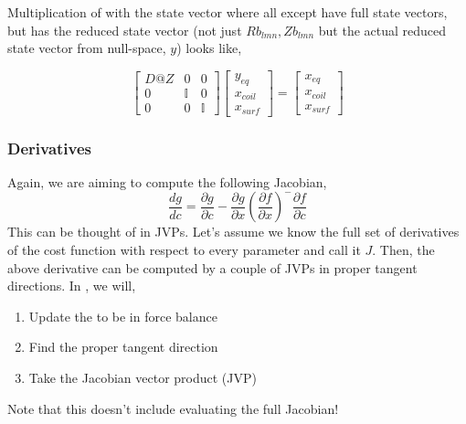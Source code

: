 Multiplication of  with the state vector where all except  have full state vectors, but  has the reduced state vector (not just $Rb_{lmn}, Zb_{lmn}$ but the actual reduced state vector from null-space, $y$) looks like,

\begin{equation}
    \begin{bmatrix}
        D@Z & 0 & 0 \\
        0 & \mathbb{I} & 0 \\
        0 & 0 & \mathbb{I} 
    \end{bmatrix}\begin{bmatrix}
        y_{eq} \\ x_{coil} \\ x_{surf}
    \end{bmatrix} = \begin{bmatrix}
        x_{eq} \\ x_{coil} \\ x_{surf}
    \end{bmatrix} \label{feasible-matmul}
\end{equation}

\subsubsection{Derivatives}

Again, we are aiming to compute the following Jacobian,
\begin{equation}
    \frac{dg}{dc} = \frac{\partial g}{\partial c} - \frac{\partial g}{\partial x} \left( \frac{\partial f}{\partial x} \right) ^{-} \frac{\partial f}{\partial c}
\end{equation}
This can be thought of in JVPs. Let's assume we know the full set of derivatives of the cost function with respect to every parameter and call it $J$. Then, the above derivative can be computed by a couple of JVPs in proper tangent directions. In , we will,
\begin{enumerate}
    \item Update the  to be in force balance
    \item Find the proper tangent direction
    \item Take the Jacobian vector product (JVP)
\end{enumerate}
Note that this doesn't include evaluating the full Jacobian!


\subsubsection{}

